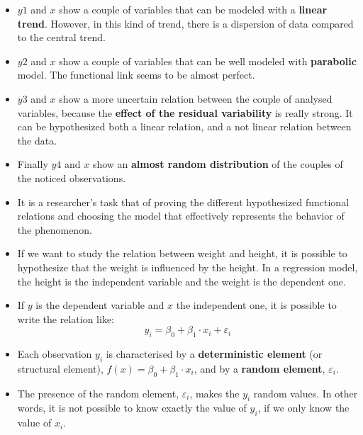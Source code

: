 \begin{frame}
  \vspace*{.2cm}
  \begin{small}
    \begin{itemize}
      \item $y1$ and $x$ show a couple of variables that can be modeled with a \textbf{linear trend}. However, in this kind of trend, there is a dispersion of data compared to the central trend. 
      \item $y2$ and $x$ show a couple of variables that can be well modeled with \textbf{parabolic} model. The functional link seems to be almost perfect.
      \item $y3$ and $x$ show a more uncertain relation between the couple of analysed variables, because the \textbf{effect of the residual variability} is really strong. It can be hypothesized both a linear relation, and a not linear relation between the data.
      \item Finally $y4$ and $x$ show an \textbf{almost random distribution} of the couples of the noticed observations.
      \item It is a researcher's task that of proving the different hypothesized functional relations and choosing the model that effectively represents the behavior of the phenomenon. 
    \end{itemize}
  \end{small}
\end{frame}





\begin{frame}
  \begin{itemize}
    \item If we want to study the relation between weight and height, it is possible to hypothesize that the weight is influenced by the height. In a regression model, the height is the independent variable and the weight is the dependent one.
    \item If $ y $ is the dependent variable and $ x $ the independent one, it is possible to write the relation like:
    \vspace{-0.4cm} $$ y_i = \beta_0 + \beta_1 \cdot x_i + \varepsilon_i $$ \vspace{-1cm} 
    \item Each observation $ y_i $ is characterised by a \textbf{deterministic element} (or structural element), $ f(x) = \beta_0 + \beta_1 \cdot  x_i $, and by a \textbf{random element}, $ \varepsilon_i $.
    \item The presence of the random element, $ \varepsilon_i $, makes the $ y_i $ random values. In other words, it is not possible to know exactly the value of $ y_i $, if we only know the value of $ x_i $.    
  \end{itemize}
\end{frame}

